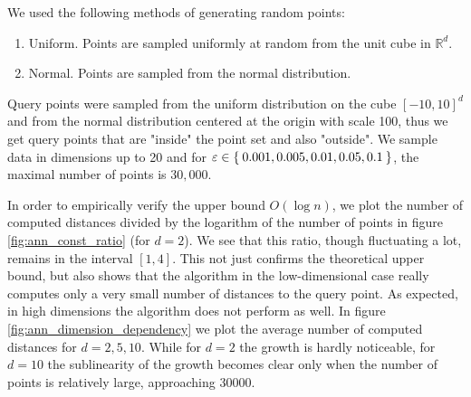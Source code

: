 \documentclass[a4paper,USenglish]{socg-lipics-v2018}
\newcommand{\R}{\mathbb{R}}
\newcommand{\eps}{\varepsilon}
\begin{document}
We used the following methods of generating random points:
\begin{enumerate}
    \item Uniform. Points are sampled uniformly at random from the unit cube in $\R^d$.
    \item Normal. Points are sampled from the normal distribution.
\end{enumerate}
Query points were sampled from the uniform distribution on the cube $[-10, 10]^d$
and from the normal distribution centered at the origin with scale 100,
thus we get query points that are "inside" the point set and also "outside".
We sample data in dimensions up to 20 and for $\eps \in \Set{0.001, 0.005, 0.01, 0.05, 0.1}$,
the maximal number of points is $30,000$.

In order to empirically verify the upper bound $O(\log n)$,
we plot the number of computed distances divided
by the logarithm of the number of points in figure \ref{fig:ann_const_ratio} (for $d = 2$).
We see that this ratio, though fluctuating a lot, remains in the interval $[1,4]$. This not just confirms
the theoretical upper bound, but also shows that the algorithm in the low-dimensional case
really computes only a very small number of distances to the query point.
As expected, in high dimensions the algorithm does not perform as well.
In figure \ref{fig:ann_dimension_dependency} we plot the average number of computed distances
for $d = 2, 5, 10$. While for $d = 2$ the growth is hardly noticeable, for $d = 10$
the sublinearity of the growth becomes clear only when the number of points is relatively large,
approaching 30000.



\end{document}
